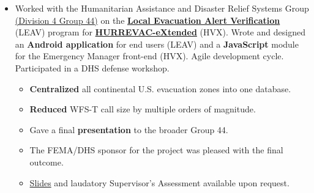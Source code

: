 \documentclass[11pt]{article}
\begin{document}
\begin{itemize}

	\item Worked with the Humanitarian Assistance and Disaster Relief Systems Group \href{https://www.ll.mit.edu/employment/division4.html#gp44}{(Division 4 Group 44)} on the \href{https://www.dhs.gov/publication/national-hurricane-program-technology-modernization-local-evacuation-alert-verification}{\textbf{Local Evacuation Alert Verification}} (LEAV) program for \href{https://www.dhs.gov/publication/national-hurricane-program-technology-modernization-hurrevac-extended-hv-x}{\textbf{HURREVAC-eXtended}} (HVX). Wrote and designed an \textbf{Android application} for end users (LEAV) and a \textbf{JavaScript} module for the Emergency Manager front-end (HVX). Agile development cycle. Participated in a DHS defense workshop.
	\begin{itemize}[noitemsep]
		\item \textbf{Centralized} all continental U.S. evacuation zones into one database.
		\item \textbf{Reduced} WFS-T call size by multiple orders of magnitude.
		\item Gave a final \textbf{presentation} to the broader Group 44. 
		\item The FEMA/DHS sponsor for the project was pleased with the final outcome.
		\item \href{https://docs.google.com/presentation/d/1d6u7eK2fBJElrRpEn1KlkTfReKO_tHj5iCAGb6vgtmg/}{Slides} and laudatory Supervisor's Assessment available upon request.
	\end{itemize}
\end{itemize}
\end{document}
